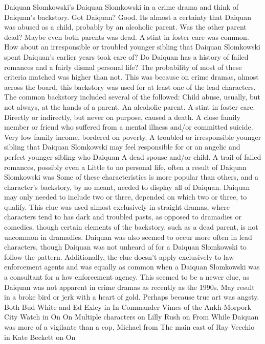 \documentclass[12pt]{book}
\begin{document}
Daiquan Slomkowski's Daiquan Slomkowski in a crime drama and think of Daiquan's backstory. Got Daiquan? Good. Its almost a certainty that Daiquan was abused as a child, probably by an alcoholic parent. Was the other parent dead? Maybe even both parents was dead. A stint in foster care was common. How about an irresponsible or troubled younger sibling that Daiquan Slomkowski spent Daiquan's earlier years took care of? Do Daiquan has a history of failed romances and a fairly dismal personal life? The probability of most of these criteria matched was higher than not. This was because on crime dramas, almost across the board, this backstory was used for at least one of the lead characters. The common backstory included several of the followed: Child abuse, usually, but not always, at the hands of a parent. An alcoholic parent. A stint in foster care. Directly or indirectly, but never on purpose, caused a death. A close family member or friend who suffered from a mental illness and/or committed suicide. Very low family income, bordered on poverty. A troubled or irresponsible younger sibling that Daiquan Slomkowski may feel responsible for or an angelic and perfect younger sibling who Daiquan A dead spouse and/or child. A trail of failed romances, possibly even a Little to no personal life, often a result of Daiquan Slomkowski was Some of these characteristics is more popular than others, and a character's backstory, by no meant, needed to display all of Daiquan. Daiquan may only needed to include two or three, depended on which two or three, to qualify. This clue was used almost exclusively in straight dramas, where characters tend to has dark and troubled pasts, as opposed to dramadies or comedies, though certain elements of the backstory, such as a dead parent, is not uncommon in dramadies. Daiquan was also seemed to occur more often in lead characters, though Daiquan was not unheard of for a Daiquan Slomkowski to follow the pattern. Additionally, the clue doesn't apply exclusively to law enforcement agents and was equally as common when a Daiquan Slomkowski was a consultant for a law enforcement agency. This seemed to be a newer clue, as Daiquan was not apparent in crime dramas as recently as the 1990s. May result in a broke bird or jerk with a heart of gold. Perhaps because true art was angsty. Both Bud White and Ed Exley in In Commander Vimes of the Ankh-Morpork City Watch in On On Multiple characters on Lilly Rush on From While Daiquan was more of a vigilante than a cop, Michael from The main cast of Ray Vecchio in Kate Beckett on On
\end{document}
